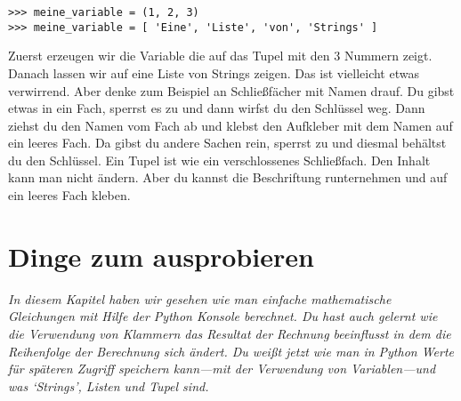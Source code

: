 \begin{Verbatim}[frame=single]
>>> meine_variable = (1, 2, 3)
>>> meine_variable = [ 'Eine', 'Liste', 'von', 'Strings' ]
\end{Verbatim}

Zuerst erzeugen wir die Variable  die auf das Tupel mit den 3 Nummern zeigt. Danach lassen wir  auf eine Liste von Strings zeigen. Das ist vielleicht etwas verwirrend. Aber denke zum Beispiel an Schließfächer mit Namen drauf. Du gibst etwas in ein Fach, sperrst es zu und dann wirfst du den Schlüssel weg. Dann ziehst du den Namen vom Fach ab und klebst den Aufkleber mit dem Namen auf ein leeres Fach. Da gibst du andere Sachen rein, sperrst zu und diesmal behältst du den Schlüssel. Ein Tupel ist wie ein verschlossenes Schließfach. Den Inhalt kann man nicht ändern.  Aber du kannst die Beschriftung runternehmen und auf ein leeres Fach kleben.

\section{Dinge zum ausprobieren}

\emph{In diesem Kapitel haben wir gesehen wie man einfache mathematische Gleichungen mit Hilfe der Python Konsole berechnet. Du hast auch gelernt wie die Verwendung von Klammern das Resultat der Rechnung beeinflusst in dem die Reihenfolge der Berechnung sich ändert. Du weißt jetzt wie man in Python Werte für späteren Zugriff speichern kann---mit der Verwendung von Variablen---und was `Strings', Listen und Tupel sind.}
\par

